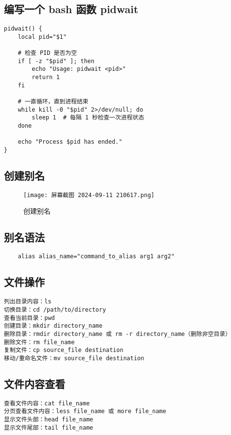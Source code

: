 \documentclass[a4paper, 12pt]{article}
\begin{document}
\subsection{编写一个 bash 函数 pidwait}
\begin{lstlisting}
pidwait() {
    local pid="$1"

    # 检查 PID 是否为空
    if [ -z "$pid" ]; then
        echo "Usage: pidwait <pid>"
        return 1
    fi

    # 一直循环，直到进程结束
    while kill -0 "$pid" 2>/dev/null; do
        sleep 1  # 每隔 1 秒检查一次进程状态
    done

    echo "Process $pid has ended."
}

\end{lstlisting}

\subsection{创建别名}
\begin{figure}[H]
    \centering
    \texttt{[image: 屏幕截图 2024-09-11 210617.png]}
    \caption{创建别名}
\end{figure}

\subsection{别名语法}
\begin{lstlisting}
    alias alias_name="command_to_alias arg1 arg2"
\end{lstlisting}

\subsection{文件操作}
\begin{lstlisting}
列出目录内容：ls
切换目录：cd /path/to/directory
查看当前目录：pwd
创建目录：mkdir directory_name
删除目录：rmdir directory_name 或 rm -r directory_name（删除非空目录）
删除文件：rm file_name
复制文件：cp source_file destination
移动/重命名文件：mv source_file destination
\end{lstlisting}

\subsection{文件内容查看}
\begin{lstlisting}
查看文件内容：cat file_name
分页查看文件内容：less file_name 或 more file_name
显示文件头部：head file_name
显示文件尾部：tail file_name
\end{lstlisting}
\end{document}
